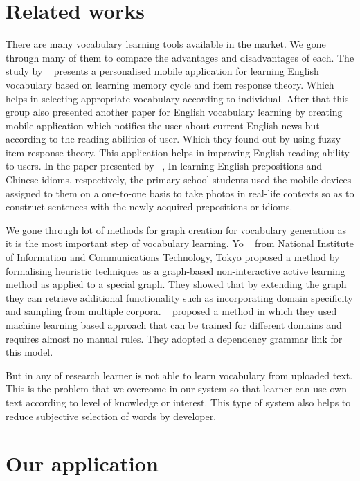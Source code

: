 \documentclass[11pt,a4paper]{article}
\begin{document}
\section{Related works}
There are many vocabulary learning tools available in the market.
We gone through many of them to compare the advantages and disadvantages of each.
The study by ~\citet{chen2008personalized} presents a personalised mobile application for
learning English vocabulary based on learning memory cycle and item response theory.
Which helps in selecting appropriate vocabulary according to individual.
After that this group also presented another paper for English vocabulary
learning by creating mobile application which notifies the user about current
English news but according to the reading abilities of user. Which they found out
by using fuzzy item response theory. This application helps in improving English reading ability to users.
In the paper presented by ~\citet{wong2010mobile}, In learning English prepositions and Chinese idioms, respectively,
the primary school students used the mobile devices assigned to them on a one-to-one basis
to take photos in real-life contexts so as to construct sentences with the newly acquired prepositions or idioms.

We gone through lot of methods for graph creation for vocabulary generation as
it is the most important step of vocabulary learning. Yo ~\citet{ehara2014formalizing}
from National Institute of Information and Communications Technology, Tokyo proposed
a method by formalising heuristic techniques as a graph-based non-interactive active
learning method as applied to a special graph. They showed that by extending the graph
they can retrieve additional functionality such as incorporating domain specificity and sampling from multiple corpora.
~\citet{zhang2001learning} proposed a method in which they used machine learning based approach
that can be trained for different domains and requires almost no manual rules.
They adopted a dependency grammar link for this model.

But in any of research learner is not able to learn vocabulary from uploaded text.
This is the problem that we overcome in our system so that learner can use own text
according to level of knowledge or interest. This type of system also helps to reduce subjective selection of words by developer. 

\section{Our application}
\end{document}

